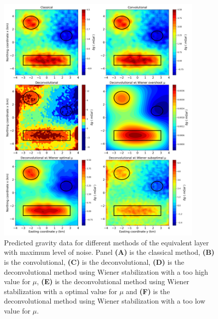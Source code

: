 \begin{figure}[htbp]
	\begin{center}
		\includegraphics[width=10cm]{Fig/stability_grav_comparison}
	\end{center}
	\caption{Predicted gravity data for different methods of the equivalent layer with maximum level of noise. Panel \textbf{(A)} is the classical method, \textbf{(B)} is the convolutional, \textbf{(C)} is the deconvolutional, \textbf{(D)} is the deconvolutional method using Wiener stabilization with a too high value for $\mu$, \textbf{(E)} is the deconvolutional method using Wiener stabilization with a optimal value for $\mu$ and \textbf{(F)} is the deconvolutional method using Wiener stabilization with a too low value for $\mu$.}
	\label{fig:5}
\end{figure}

